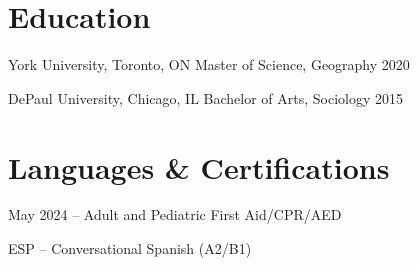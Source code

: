 \documentclass{../styles/resume}
\begin{document}
\section{Education}

\subsectionlocationdate
    {York University, Toronto, ON}
    {Master of Science, Geography}
    {2020}

\subsectionlocationdate
    {DePaul University, Chicago, IL}
    {Bachelor of Arts, Sociology}
    {2015}

\section{Languages \& Certifications}
\resumesublistbegin
    \item May 2024 -- Adult and Pediatric First Aid/CPR/AED
    \item ESP -- Conversational Spanish (A2/B1)
\resumesublistend
\end{document}
